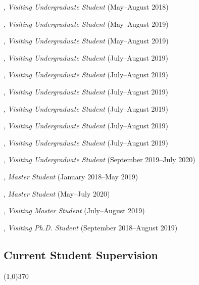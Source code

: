 \documentclass[10pt]{article}
\newenvironment{myindentpar}[1]%
{\begin{list}{}%
         {\setlength{\leftmargin}{#1}}%
         \item[]%
}
{\end{list}}
\newcounter{list}
\begin{document}
\begin{myindentpar}{0.75cm}
\hspace{-0.75cm}{\bf Yu Shu}, \textit{Visiting Undergraduate Student} (May--August 2018)

\hspace{-0.75cm}{\bf Chuchen Deng}, \textit{Visiting Undergraduate Student} (May--August 2019)

\hspace{-0.75cm}{\bf Yihong Ma}, \textit{Visiting Undergraduate Student} (May--August 2019)

\hspace{-0.75cm}{\bf Xin Liu}, \textit{Visiting Undergraduate Student} (July--August 2019)

\hspace{-0.75cm}{\bf Wei Peng}, \textit{Visiting Undergraduate Student} (July--August 2019)

\hspace{-0.75cm}{\bf Mengxia Yu}, \textit{Visiting Undergraduate Student} (July--August 2019)

\hspace{-0.75cm}{\bf Kaifeng Yu}, \textit{Visiting Undergraduate Student} (July--August 2019)

\hspace{-0.75cm}{\bf Zhihan Zhang}, \textit{Visiting Undergraduate Student} (July--August 2019)

\hspace{-0.75cm}{\bf Yang Zhou}, \textit{Visiting Undergraduate Student} (July--August 2019)

\hspace{-0.75cm}{\bf Zaitang Li}, \textit{Visiting Undergraduate Student} (September 2019--July 2020)

\hspace{-0.75cm}{\bf Xueying Wang}, \textit{Master Student} (January 2018--May 2019)

\hspace{-0.75cm}{\bf Bhakti Sharma}, \textit{Master Student} (May--July 2020)

\hspace{-0.75cm}{\bf Zijian Hu}, \textit{Visiting Master Student} (July--August 2019)

\hspace{-0.75cm}{\bf Tianwen Jiang}, \textit{Visiting Ph.D. Student} (September 2018--August 2019)

\end{myindentpar}

\subsection{\sc Current Student Supervision}
\vspace{-0.4cm} \line(1,0){370} \vspace{-0.1cm}
\end{document}
